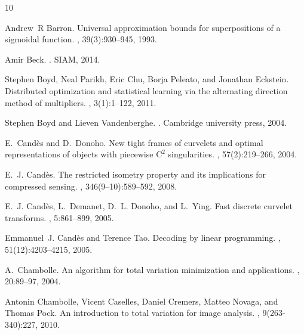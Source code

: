 \begin{thebibliography}{10}

Andrew~R Barron.
\newblock Universal approximation bounds for superpositions of a sigmoidal
  function.
, 39(3):930--945, 1993.

Amir Beck.
.
\newblock SIAM, 2014.

Stephen Boyd, Neal Parikh, Eric Chu, Borja Peleato, and Jonathan Eckstein.
\newblock Distributed optimization and statistical learning via the alternating
  direction method of multipliers.
,
  3(1):1--122, 2011.

Stephen Boyd and Lieven Vandenberghe.
.
\newblock Cambridge university press, 2004.

E.~Cand\`es and D.~Donoho.
\newblock New tight frames of curvelets and optimal representations of objects
  with piecewise {$\text{C}^2$} singularities.
, 57(2):219--266, 2004.

E.~J. Cand{\`e}s.
\newblock The restricted isometry property and its implications for compressed
  sensing.
, 346(9--10):589--592, 2008.

E.~J. Cand{\`e}s, L.~Demanet, D.~L. Donoho, and L.~Ying.
\newblock Fast discrete curvelet transforms.
, 5:861--899, 2005.

Emmanuel~J. Cand{\`e}s and Terence Tao.
\newblock Decoding by linear programming.
, 51(12):4203--4215,
  2005.

A.~Chambolle.
\newblock An algorithm for total variation minimization and applications.
, 20:89--97, 2004.

Antonin Chambolle, Vicent Caselles, Daniel Cremers, Matteo Novaga, and Thomas
  Pock.
\newblock An introduction to total variation for image analysis.
, 9(263-340):227, 2010.


\end{thebibliography}
